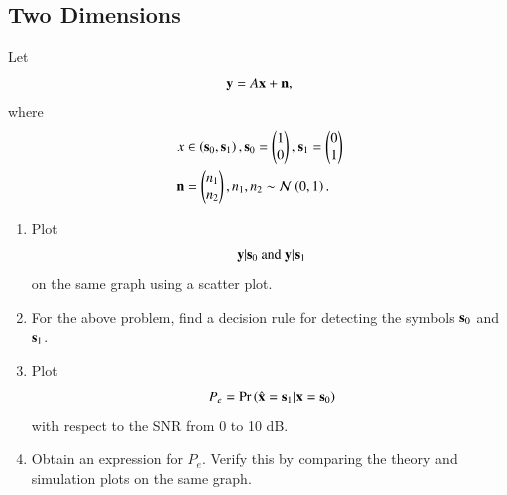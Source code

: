 \documentclass[journal,12pt,twocolumn]{IEEEtran}
\renewcommand\thesection{\arabic{section}}
\begin{document}
\begin{enumerate}[label=\thesection.\arabic*,ref=\thesection.\theenumi]
\section{Two Dimensions}
Let
\begin{equation}
\mathbf{y} = A\mathbf{x} + \mathbf{n},
\end{equation}
where
\begin{align}
x &\in \left(\mathbf{s}_0,\mathbf{s}_1\right),
\mathbf{s}_0 =
\begin{pmatrix}
1
\\
0
\end{pmatrix},
\mathbf{s}_1 =
\begin{pmatrix}
0
\\
1
\end{pmatrix}
\\
\mathbf{n} &=
\begin{pmatrix}
n_1
\\
n_2
\end{pmatrix},
n_1,n_2 \sim \mathcal{N}\left(0,1\right).
\end{align}
%
\begin{enumerate}[label=\thesection.\arabic*
,ref=\thesection.\theenumi]
\item
\label{ch5_fsk}
Plot
%
\begin{equation}
\mathbf{y}|\mathbf{s}_0 \text{ and } \mathbf{y}|\mathbf{s}_1
\end{equation}
%
on the same graph using a scatter plot.
%
\item
For the above problem, find a decision rule for detecting the symbols $\mathbf{s}_0 $ and $\mathbf{s}_1$.
%
\item
Plot
\begin{equation}
P_e = \Pr\left(\hat{\mathbf{x}} = \mathbf{s}_1|\mathbf{x} = \mathbf{s}_0\right)
\end{equation}
with respect to the SNR from 0 to 10 dB.
%
\item
Obtain an expression for $P_e$. Verify this by comparing the theory and simulation plots on the same graph.
%
		\end{enumerate}
\end{enumerate}	
\end{document}
